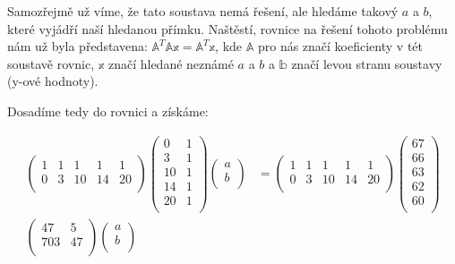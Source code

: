 \documentclass{../../../ksp}
\begin{document}
Samozřejmě už víme, že tato soustava nemá řešení, ale hledáme takový $a$ a $b$, které vyjádří naší hledanou přímku.
Naštěstí, rovnice na řešení tohoto problému nám už byla představena: $\mathbb{A}^T \mathbb{Ax} = \mathbb{A}^T \mathbb{x}$, 
kde $\mathbb{A}$ pro nás značí koeficienty v tét soustavě rovnic, $\mathbb{x}$ značí hledané neznámé $a$ a $b$ a $\mathbb{b}$ značí
levou stranu soustavy (y-ové hodnoty).

Dosadíme tedy do rovnici a získáme:

\begin{align*}
    \begin{pmatrix}
        1 & 1 & 1 & 1 & 1 \\
        0 & 3 & 10 & 14 & 20 \\
    \end{pmatrix}
    \begin{pmatrix}
        0 & 1 \\
        3 & 1 \\
        10 & 1 \\
        14 & 1 \\
        20 & 1 \\
    \end{pmatrix}
    \begin{pmatrix}
        a \\
        b \\
    \end{pmatrix}
    &=
    \begin{pmatrix}
        1 & 1 & 1 & 1 & 1 \\
        0 & 3 & 10 & 14 & 20 \\
    \end{pmatrix}
    \begin{pmatrix}
        67 \\
        66 \\
        63 \\
        62 \\
        60 \\
    \end{pmatrix}
    \\
    \begin{pmatrix}
        47 & 5 \\
        703 & 47 \\
    \end{pmatrix}
    \begin{pmatrix}
        a \\
        b \\
    \end{pmatrix}

\end{align*}
\end{document}
